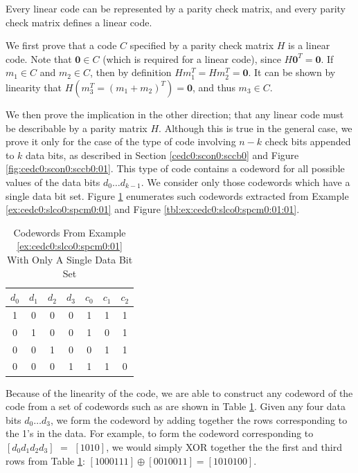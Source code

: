 \begin{vworklemmastatement}
\label{lem:cedc0:slco0:spcm0:01}
Every linear code can be represented by a parity check matrix, and every 
parity check matrix defines a linear code.
\end{vworklemmastatement}
\begin{vworklemmaproof}
We first prove that a code $C$ specified by a parity check matrix $H$
is a linear code.  Note that $\mathbf{0} \in C$ (which is required for a linear code), 
since $H \mathbf{0}^T = \mathbf{0}$.  If $m_1 \in C$ and $m_2 \in C$, then 
by definition $H m_1^T = H m_2^T = \mathbf{0}$.  It can be shown by linearity
that $H (m_3^T = (m_1 + m_2)^T) = \mathbf{0}$, and thus $m_3 \in C$.

We then prove the implication in the other direction; that any linear code must be
describable by a parity matrix $H$.  Although this is true in the general
case, we prove it only for the case of the type of code involving
$n-k$ check bits appended to $k$ data bits, as described in
Section \ref{cedc0:scon0:sccb0} and Figure 
\ref{fig:cedc0:scon0:sccb0:01}.  This type of code contains a codeword
for all possible values of the data bits $d_0 \ldots d_{k-1}$.  We 
consider only those codewords which have a single data bit set.  Figure
\ref{tbl:lem:cedc0:slco0:spcm0:01:01} enumerates such codewords extracted 
from Example \ref{ex:cedc0:slco0:spcm0:01} and Figure
\ref{tbl:ex:cedc0:slco0:spcm0:01:01}.

\begin{table}
\caption{Codewords From Example \ref{ex:cedc0:slco0:spcm0:01} With Only A Single Data Bit Set}
\label{tbl:lem:cedc0:slco0:spcm0:01:01}
\begin{center}
\begin{tabular}{|c|c|c|c|c|c|c|}
\hline
$d_0$ & $d_1$ & $d_2$ & $d_3$ & $c_0$ & $c_1$ & $c_2$ \\
\hline
\hline
  1   &  0    &  0    &  0    &  1    &  1    &  1    \\
\hline
  0   &  1    &  0    &  0    &  1    &  0    &  1    \\
\hline
  0   &  0    &  1    &  0    &  0    &  1    &  1    \\
\hline
  0   &  0    &  0    &  1    &  1    &  1    &  0    \\
\hline
\end{tabular}
\end{center}
\end{table}

Because of the linearity of the code, we are able to construct any
codeword of the code from a set of codewords such as are
shown in Table \ref{tbl:lem:cedc0:slco0:spcm0:01:01}.  Given
any four data bits $d_0 \ldots d_3$, we form the codeword
by adding together the rows corresponding to the 1's in the
data.  For example, to form the codeword corresponding to
$[d_0 d_1 d_2 d_3]$ $=$ $[1010]$, we would simply XOR together
the the first and third rows from Table \ref{tbl:lem:cedc0:slco0:spcm0:01:01}:
$[1000111] \oplus [0010011] = [1010100]$.


\end{vworklemmaproof}
